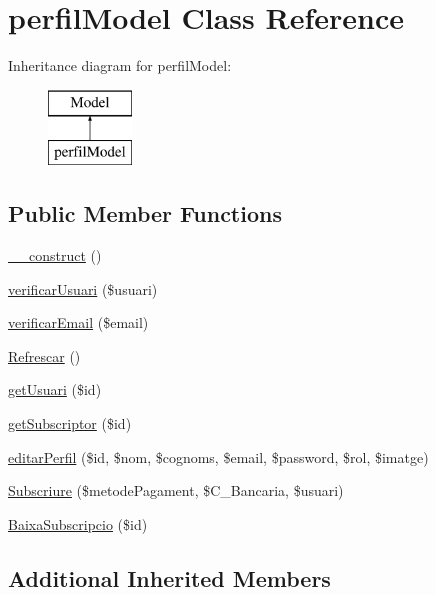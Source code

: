 \hypertarget{classperfil_model}{}\section{perfil\+Model Class Reference}
\label{classperfil_model}
Inheritance diagram for perfil\+Model\+:\begin{figure}[H]
\begin{center}
\leavevmode
\includegraphics[height=2.000000cm]{classperfil_model}
\end{center}
\end{figure}
\subsection*{Public Member Functions}
\begin{DoxyCompactItemize}
\item 
\hyperlink{classperfil_model_a095c5d389db211932136b53f25f39685}{\+\_\+\+\_\+construct} ()
\item 
\hyperlink{classperfil_model_af9f28a60e12342c55a38d2835ed53db5}{verificar\+Usuari} (\$usuari)
\item 
\hyperlink{classperfil_model_a761f49dd7b8c281badea7d096c0175fa}{verificar\+Email} (\$email)
\item 
\hyperlink{classperfil_model_a33fa2a867ee074e63f41c52b3b31e74b}{Refrescar} ()
\item 
\hyperlink{classperfil_model_ac9149067cf9637bfa353a5da3d053126}{get\+Usuari} (\$id)
\item 
\hyperlink{classperfil_model_a13c3e86b8ae38e323dd73fd9dd1ca4d8}{get\+Subscriptor} (\$id)
\item 
\hyperlink{classperfil_model_a71b5e287eba20fe6851553498b36fb49}{editar\+Perfil} (\$id, \$nom, \$cognoms, \$email, \$password, \$rol, \$imatge)
\item 
\hyperlink{classperfil_model_a48a9ec7ca871626578ed47e2a1c9b67e}{Subscriure} (\$metode\+Pagament, \$C\+\_\+\+Bancaria, \$usuari)
\item 
\hyperlink{classperfil_model_a5a9349a32a49732594e7cd1d11aea670}{Baixa\+Subscripcio} (\$id)
\end{DoxyCompactItemize}
\subsection*{Additional Inherited Members}


